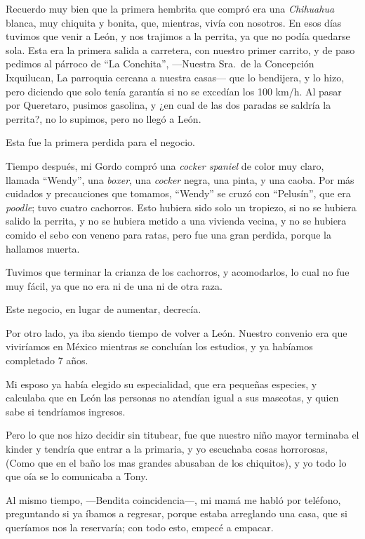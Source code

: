 \documentclass[letterpaper, 12pt]{book}
\begin{document}
Recuerdo muy bien que la primera hembrita que compró era una \textit{Chihuahua} blanca, muy chiquita y bonita, que, mientras, vivía con nosotros. En esos días tuvimos que venir a León, y nos trajimos a la perrita, ya que no podía quedarse sola. Esta era la primera salida a carretera, con nuestro primer carrito, y de paso pedimos al párroco de ``La Conchita'', ---Nuestra Sra.\ de la Concepción Ixquilucan, La parroquia cercana a nuestra casas--- que lo bendijera, y lo hizo, pero diciendo que solo tenía garantía si no se excedían los 100 km/h. Al pasar por Queretaro, pusimos gasolina, y ¿en cual de las dos paradas se saldría la perrita?, no lo supimos, pero no llegó a León. 

Esta fue la primera perdida para el negocio.

Tiempo después, mi Gordo compró una \textit{cocker spaniel} de color muy claro, llamada ``Wendy'', una \textit{boxer}, una \textit{cocker} negra, una pinta, y una caoba. Por más cuidados y precauciones que tomamos, ``Wendy'' se cruzó con ``Pelusín'', que era \textit{poodle}; tuvo cuatro cachorros. Esto hubiera sido solo un tropiezo, si no se hubiera salido la perrita, y no se hubiera metido a una vivienda vecina, y no se hubiera comido el sebo con veneno para ratas, pero fue una gran perdida, porque la hallamos muerta. 

Tuvimos que terminar la crianza de los cachorros, y acomodarlos, lo cual no fue muy fácil, ya que no era ni de una ni de otra raza.

Este negocio, en lugar de aumentar, decrecía.

Por otro lado, ya iba siendo tiempo de volver a León. Nuestro convenio era que viviríamos en México mientras se concluían los estudios, y ya habíamos completado 7 años.

Mi esposo ya había elegido su especialidad, que era pequeñas especies, y calculaba que en León las personas no atendían igual a sus mascotas, y quien sabe si tendríamos ingresos.

Pero lo que nos hizo decidir sin titubear, fue que nuestro niño mayor terminaba el kinder y tendría que entrar a la primaria, y yo escuchaba cosas horrorosas, (Como que en el baño los mas grandes abusaban de los chiquitos), y yo todo lo que oía se lo comunicaba a Tony.

Al mismo tiempo, ---Bendita coincidencia---, mi mamá me habló por teléfono, preguntando si ya íbamos a regresar, porque estaba arreglando una casa, que si queríamos nos la reservaría; con todo esto, empecé a empacar.
\end{document}
